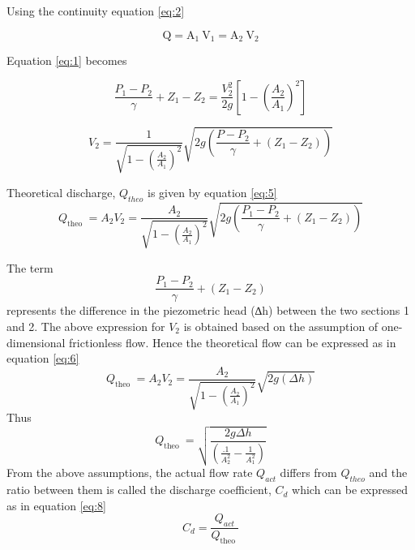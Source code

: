 Using the continuity equation \ref{eq:2} 

\begin{equation}
\label{eq:2}
\mathrm{Q}=\mathrm{A}_{1} \mathrm{~V}_{1}=\mathrm{A}_{2} \mathrm{~V}_{2}
\end{equation}

Equation \ref{eq:1} becomes

\begin{equation}
\label{eq:3}
\frac{P_{1}-P_{2}}{\gamma}+Z_{1}-Z_{2}=\frac{V_{2}^{2}}{2 g}\left[1-\left(\frac{A_{2}}{A_{1}}\right)^{2}\right]
\end{equation}

\begin{equation}
\label{eq:4}
V_{2}=\frac{1}{\sqrt{1-\left(\frac{A_{2}}{A_{1}}\right)^{2}}} \sqrt{2 g\left(\frac{P-P_{2}}{\gamma}+\left(Z_{1}-Z_{2}\right)\right)}
\end{equation}

Theoretical discharge, $Q_{theo}$ is given by equation \ref{eq:5}
\begin{equation}
\label{eq:5}
Q_{\text {theo }}=A_{2} V_{2}=\frac{A_{2}}{\sqrt{1-\left(\frac{A_{2}}{A_{1}}\right)^{2}}} \sqrt{2 g\left(\frac{P_{1}-P_{2}}{\gamma}+\left(Z_{1}-Z_{2}\right)\right)}
\end{equation}

The term
\begin{equation}
\frac{P_{1}-P_{2}}{\gamma}+\left(Z_{1}-Z_{2}\right)
\end{equation}
 represents the difference in the piezometric head (∆h) between the two sections 1 and 2. The above expression for $V_{2}$ is obtained based on the assumption of one-dimensional frictionless flow. Hence the theoretical flow can be expressed as in equation \ref{eq:6}
 \begin{equation}
 \label{eq:6}
Q_{\text {theo }}=A_{2} V_{2}=\frac{A_{2}}{\sqrt{1-\left(\frac{A_{2}}{A_{1}}\right)^{2}}} \sqrt{2 g(\Delta h)}
\end{equation}
Thus
\begin{equation}
\label{eq:7}
Q_{\text {theo }}=\sqrt{\frac{2 g \Delta h}{\left(\frac{.1}{A_{2}^{2}}-\frac{1}{A_{1}^{2}}\right)}}
\end{equation}
From the above assumptions, the actual flow rate $Q_{act}$ differs from $Q_{theo}$ and the ratio between them is called the discharge coefficient, $C_{d}$ which can be expressed as in  equation \ref{eq:8}
\begin{equation}
\label{eq:8}
C_{d}=\frac{Q_{a c t}}{Q_{\text {theo }}}
\end{equation}

